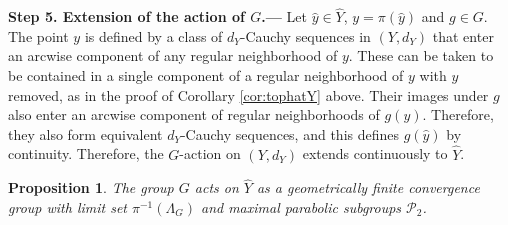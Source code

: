 \documentclass[11pt]{article}
\newtheorem{proposition}[theorem]{Proposition}
\theoremstyle{definition}
\newcommand\PP{\mathcal{P}}
\renewcommand\hat{\widehat}
\begin{document}
\medskip

{\noindent\bf Step 5. Extension of the action of $G$.---} Let $\hat{y}\in \hat{Y}$, $y=\pi(\hat{y})$ and $g\in G$. The point $y$ is defined by a class of $d_Y$-Cauchy sequences in $(Y,d_Y)$ that enter an arcwise component of any regular neighborhood of $y$. These can be taken to be contained in a single component of a regular neighborhood of $y$ with $y$ removed, as in the proof of Corollary \ref{cor:tophatY} above.   Their images 
under $g$ also enter an arcwise component of regular neighborhoods of $g(y)$. Therefore, they also form equivalent $d_Y$-Cauchy sequences, and this defines $g(\hat{y})$
by continuity.
Therefore,
 the $G$-action on $(Y,d_Y)$ extends continuously to $\hat{Y}$. 



\begin{proposition}\label{prop:liftedactiop} The group $G$ acts on $\hat{Y}$ as a geometrically finite convergence group with limit set $\pi^{-1}(\Lambda_G)$ and maximal parabolic subgroups $\PP_2$. 
\end{proposition}
\end{document}
